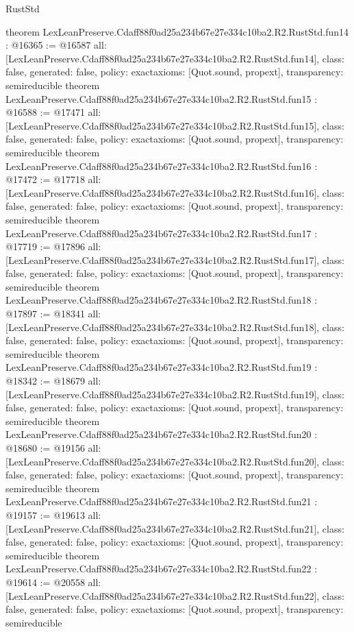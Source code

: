 \begin{lexlean}{RustStd}
\begin{coremodule}
{}
theorem LexLeanPreserve.Cdaff88f0ad25a234b67e27e334c10ba2.R2.RustStd.fun14 : @16365 := @16587 {
  all: [LexLeanPreserve.Cdaff88f0ad25a234b67e27e334c10ba2.R2.RustStd.fun14],
  class: false,
  generated: false,
  policy: exact{axioms: [Quot.sound, propext]},
  transparency: semireducible
}
theorem LexLeanPreserve.Cdaff88f0ad25a234b67e27e334c10ba2.R2.RustStd.fun15 : @16588 := @17471 {
  all: [LexLeanPreserve.Cdaff88f0ad25a234b67e27e334c10ba2.R2.RustStd.fun15],
  class: false,
  generated: false,
  policy: exact{axioms: [Quot.sound, propext]},
  transparency: semireducible
}
theorem LexLeanPreserve.Cdaff88f0ad25a234b67e27e334c10ba2.R2.RustStd.fun16 : @17472 := @17718 {
  all: [LexLeanPreserve.Cdaff88f0ad25a234b67e27e334c10ba2.R2.RustStd.fun16],
  class: false,
  generated: false,
  policy: exact{axioms: [Quot.sound, propext]},
  transparency: semireducible
}
theorem LexLeanPreserve.Cdaff88f0ad25a234b67e27e334c10ba2.R2.RustStd.fun17 : @17719 := @17896 {
  all: [LexLeanPreserve.Cdaff88f0ad25a234b67e27e334c10ba2.R2.RustStd.fun17],
  class: false,
  generated: false,
  policy: exact{axioms: [Quot.sound, propext]},
  transparency: semireducible
}
theorem LexLeanPreserve.Cdaff88f0ad25a234b67e27e334c10ba2.R2.RustStd.fun18 : @17897 := @18341 {
  all: [LexLeanPreserve.Cdaff88f0ad25a234b67e27e334c10ba2.R2.RustStd.fun18],
  class: false,
  generated: false,
  policy: exact{axioms: [Quot.sound, propext]},
  transparency: semireducible
}
theorem LexLeanPreserve.Cdaff88f0ad25a234b67e27e334c10ba2.R2.RustStd.fun19 : @18342 := @18679 {
  all: [LexLeanPreserve.Cdaff88f0ad25a234b67e27e334c10ba2.R2.RustStd.fun19],
  class: false,
  generated: false,
  policy: exact{axioms: [Quot.sound, propext]},
  transparency: semireducible
}
theorem LexLeanPreserve.Cdaff88f0ad25a234b67e27e334c10ba2.R2.RustStd.fun20 : @18680 := @19156 {
  all: [LexLeanPreserve.Cdaff88f0ad25a234b67e27e334c10ba2.R2.RustStd.fun20],
  class: false,
  generated: false,
  policy: exact{axioms: [Quot.sound, propext]},
  transparency: semireducible
}
theorem LexLeanPreserve.Cdaff88f0ad25a234b67e27e334c10ba2.R2.RustStd.fun21 : @19157 := @19613 {
  all: [LexLeanPreserve.Cdaff88f0ad25a234b67e27e334c10ba2.R2.RustStd.fun21],
  class: false,
  generated: false,
  policy: exact{axioms: [Quot.sound, propext]},
  transparency: semireducible
}
theorem LexLeanPreserve.Cdaff88f0ad25a234b67e27e334c10ba2.R2.RustStd.fun22 : @19614 := @20558 {
  all: [LexLeanPreserve.Cdaff88f0ad25a234b67e27e334c10ba2.R2.RustStd.fun22],
  class: false,
  generated: false,
  policy: exact{axioms: [Quot.sound, propext]},
  transparency: semireducible
}
\end{coremodule}
\end{lexlean}

